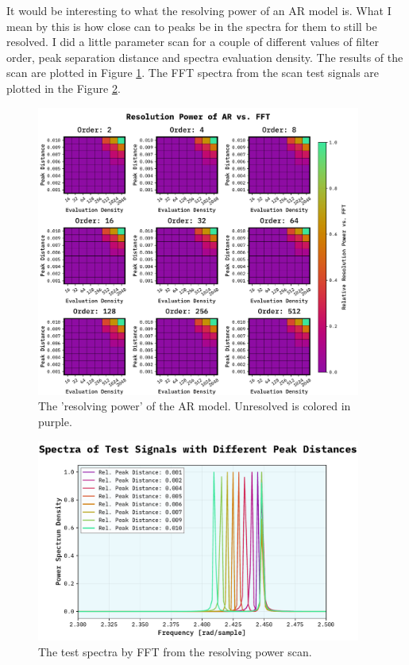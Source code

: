 \documentclass[10pt, titlepage, a4paper]{article}
\begin{document}
It would be interesting to what the resolving power of an AR model is. What I mean by this is how close can to peaks 
be in the spectra for them to still be resolved. I did a little parameter scan for a couple of different values of filter 
order, peak separation distance and spectra evaluation density. The results of the scan are plotted in Figure 
\ref{fig:resolving-power}. The FFT spectra from the scan test signals are plotted in the Figure \ref{fig:resolving-power-test}.

\begin{figure}[H]
    \centering
    \includegraphics[width=0.95\textwidth]{../MaxEntropy/Images/s-res.pdf}
    \caption{The 'resolving power' of the AR model. Unresolved is colored in purple.}
    \label{fig:resolving-power}
\end{figure}

\begin{figure}[H]
    \centering
    \includegraphics[width=0.95\textwidth]{../MaxEntropy/Images/test-spectra.pdf}
    \caption{The test spectra by FFT from the resolving power scan.}
    \label{fig:resolving-power-test}
\end{figure}
\end{document}
